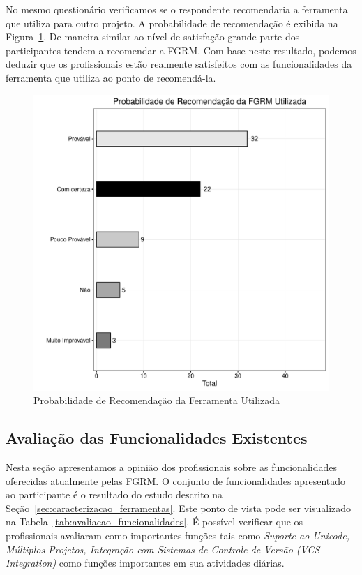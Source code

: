 No mesmo questionário verificamos se o respondente recomendaria a ferramenta que
utiliza para outro projeto. A probabilidade de recomendação é exibida na
Figura~\ref{fig:grafico_melhorias_fgrm_probabilidade_recomentacao}. De maneira
similar ao nível de satisfação grande parte dos participantes tendem a
recomendar a FGRM\@. Com base neste resultado, podemos deduzir que os
profissionais estão realmente satisfeitos com as funcionalidades da ferramenta
que utiliza ao ponto de recomendá-la.

\begin{figure}[htpb]
	\centering
	\includegraphics[width=0.6\linewidth]{./chapter-pesquisa-com-profissionais/img/grafico_melhorias_fgrm_probabilidade_recomentacao.pdf}
	\caption{Probabilidade de Recomendação da Ferramenta Utilizada}
\label{fig:grafico_melhorias_fgrm_probabilidade_recomentacao}
\end{figure}

\subsection{Avaliação das Funcionalidades Existentes}
\label{sub:avaliação_das_funcionalidades_existentes}

Nesta seção apresentamos a opinião dos profissionais sobre as funcionalidades
oferecidas atualmente pelas FGRM\@. O conjunto de funcionalidades apresentado ao
participante é o resultado do estudo descrito na
Seção~\ref{sec:caracterizacao_ferramentas}. Este ponto de vista pode ser
visualizado na Tabela~\ref{tab:avaliacao_funcionalidades}. É possível verificar
que os profissionais avaliaram como importantes funções tais como
\textit{Suporte ao Unicode, Múltiplos Projetos, Integração com Sistemas de
	Controle de Versão (VCS Integration)} como  funções importantes em sua
atividades diárias.

